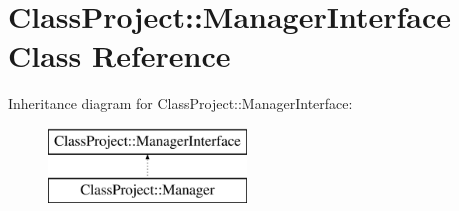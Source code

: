 \section{Class\+Project\+:\+:Manager\+Interface Class Reference}
\label{classClassProject_1_1ManagerInterface}
Inheritance diagram for Class\+Project\+:\+:Manager\+Interface\+:\begin{figure}[H]
\begin{center}
\leavevmode
\includegraphics[height=2.000000cm]{classClassProject_1_1ManagerInterface}
\end{center}
\end{figure}
